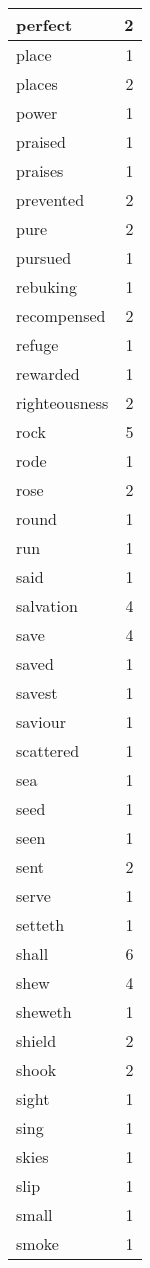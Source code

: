 \begin{center}
\begin{longtable}{l|r}
perfect & 2 \\ \hline
place & 1 \\ \hline
places & 2 \\ \hline
power & 1 \\ \hline
praised & 1 \\ \hline
praises & 1 \\ \hline
prevented & 2 \\ \hline
pure & 2 \\ \hline
pursued & 1 \\ \hline
rebuking & 1 \\ \hline
recompensed & 2 \\ \hline
refuge & 1 \\ \hline
rewarded & 1 \\ \hline
righteousness & 2 \\ \hline
rock & 5 \\ \hline
rode & 1 \\ \hline
rose & 2 \\ \hline
round & 1 \\ \hline
run & 1 \\ \hline
said & 1 \\ \hline
salvation & 4 \\ \hline
save & 4 \\ \hline
saved & 1 \\ \hline
savest & 1 \\ \hline
saviour & 1 \\ \hline
scattered & 1 \\ \hline
sea & 1 \\ \hline
seed & 1 \\ \hline
seen & 1 \\ \hline
sent & 2 \\ \hline
serve & 1 \\ \hline
setteth & 1 \\ \hline
shall & 6 \\ \hline
shew & 4 \\ \hline
sheweth & 1 \\ \hline
shield & 2 \\ \hline
shook & 2 \\ \hline
sight & 1 \\ \hline
sing & 1 \\ \hline
skies & 1 \\ \hline
slip & 1 \\ \hline
small & 1 \\ \hline
smoke & 1 \\ \hline

\end{longtable}
\end{center}
